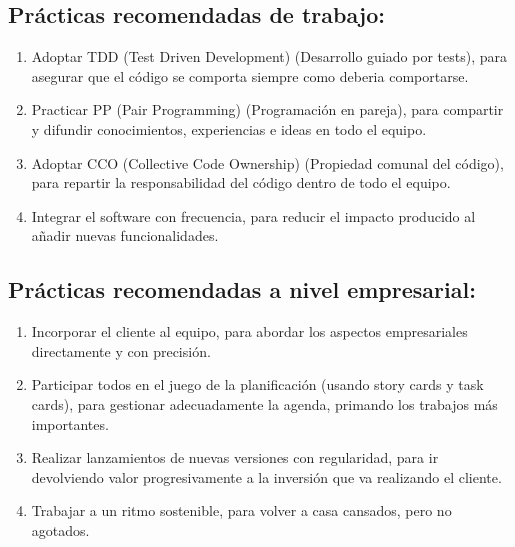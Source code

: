 \documentclass[spanish,12pt,a4paper,final,oneside]{book}
\begin{document}
\subsection*{Prácticas recomendadas de trabajo:}
\begin{enumerate}
\item Adoptar TDD (Test Driven Development) (Desarrollo guiado por tests),
para asegurar que el código se comporta siempre como deberia comportarse.
\item Practicar PP (Pair Programming) (Programación en pareja),
para compartir y difundir conocimientos, experiencias e ideas en todo el equipo.
\item Adoptar CCO (Collective Code Ownership) (Propiedad comunal del código),
para repartir la responsabilidad del código dentro de todo el equipo.
\item Integrar el software con frecuencia,
para reducir el impacto producido al añadir nuevas funcionalidades.
\end{enumerate}

\subsection*{Prácticas recomendadas a nivel empresarial:}
\begin{enumerate}
\item Incorporar el cliente al equipo,
para abordar los aspectos empresariales directamente y con precisión.
\item Participar todos en el juego de la planificación (usando story cards y task cards),
para gestionar adecuadamente la agenda, primando los trabajos más importantes.
\item Realizar lanzamientos de nuevas versiones con regularidad,
para ir devolviendo valor progresivamente a la inversión que va realizando el cliente.
\item Trabajar a un ritmo sostenible,
para volver a casa cansados, pero no agotados.
\end{enumerate}
\end{document}
